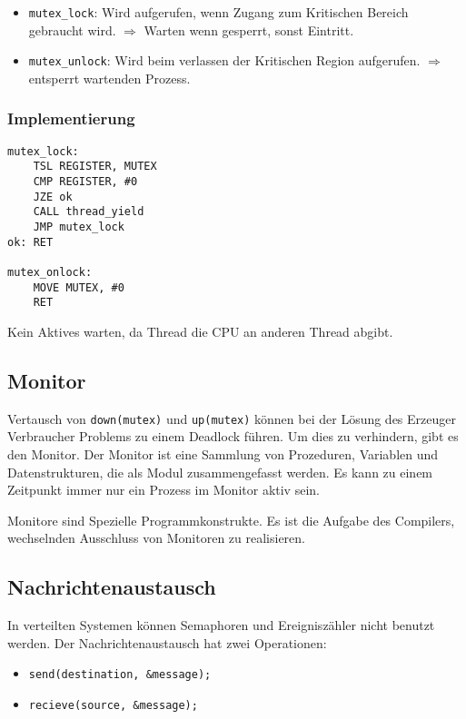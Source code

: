 \begin{itemize}
    \item \texttt{mutex\_lock}: Wird aufgerufen, wenn Zugang zum Kritischen Bereich gebraucht wird. $\Rightarrow{}$ Warten wenn gesperrt, sonst Eintritt.
    \item \texttt{mutex\_unlock}: Wird beim verlassen der Kritischen Region aufgerufen. $\Rightarrow$ entsperrt wartenden Prozess.
\end{itemize}

\subsubsection*{Implementierung}

\begin{lstlisting}[language={[x86masm]Assembler}]
mutex_lock:
    TSL REGISTER, MUTEX
    CMP REGISTER, #0
    JZE ok
    CALL thread_yield
    JMP mutex_lock
ok: RET

mutex_onlock:
    MOVE MUTEX, #0
    RET 
\end{lstlisting}

Kein Aktives warten, da Thread die CPU an anderen Thread abgibt.

\subsection{Monitor}

Vertausch von \texttt{down(mutex)} und \texttt{up(mutex)} können bei der Lösung
des Erzeuger Verbraucher Problems zu einem Deadlock führen. Um dies zu
verhindern, gibt es den Monitor. Der Monitor ist eine Sammlung von Prozeduren,
Variablen und Datenstrukturen, die als Modul zusammengefasst werden. Es kann zu
einem Zeitpunkt immer nur ein Prozess im Monitor aktiv sein.

Monitore sind Spezielle Programmkonstrukte. Es ist die Aufgabe des Compilers,
wechselnden Ausschluss von Monitoren zu realisieren.

\subsection{Nachrichtenaustausch}

In verteilten Systemen können Semaphoren und Ereigniszähler nicht benutzt
werden. Der Nachrichtenaustausch hat zwei Operationen:

\begin{itemize}
    \item \texttt{send(destination, \&message);}
    \item \texttt{recieve(source, \&message);}
\end{itemize}

